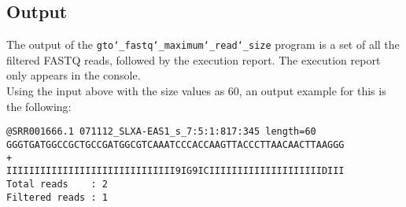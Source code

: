 \subsection*{Output}
The output of the \texttt{gto\char`_fastq\char`_maximum\char`_read\char`_size} program is a set of all the filtered FASTQ reads, followed by the execution report.
The execution report only appears in the console.\\
Using the input above with the size values as 60, an output example for this is the following:
\begin{lstlisting}
@SRR001666.1 071112_SLXA-EAS1_s_7:5:1:817:345 length=60
GGGTGATGGCCGCTGCCGATGGCGTCAAATCCCACCAAGTTACCCTTAACAACTTAAGGG
+
IIIIIIIIIIIIIIIIIIIIIIIIIIIIII9IG9ICIIIIIIIIIIIIIIIIIIIIDIII
Total reads    : 2
Filtered reads : 1
\end{lstlisting}
